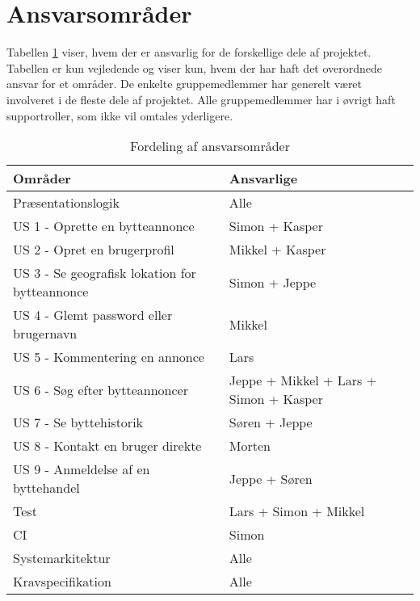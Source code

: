 \section{Ansvarsområder}
Tabellen \ref{fig:Ansvarstabel} viser, hvem der er ansvarlig for de forskellige dele af projektet. Tabellen er kun vejledende og viser kun, hvem der har haft det overordnede ansvar for et områder. De enkelte gruppemedlemmer har generelt været involveret i de fleste dele af projektet. Alle gruppemedlemmer har i øvrigt haft supportroller, som ikke vil omtales yderligere.  
\begin{table}[H]
	\begin{tabular}{ | l | p{5cm} |}
		\hline
		\textbf{Områder}  & \textbf{Ansvarlige} \\ \hline
		Præsentationslogik & Alle \\ \hline
		US 1 - Oprette en bytteannonce & Simon + Kasper \\ \hline
		US 2 - Opret en brugerprofil & Mikkel + Kasper \\ \hline
		US 3 - Se geografisk lokation for bytteannonce & Simon + Jeppe \\ \hline
		US 4 - Glemt password eller brugernavn & Mikkel \\ \hline
		US 5 - Kommentering en annonce & Lars \\ \hline
		US 6 - Søg efter bytteannoncer & Jeppe + Mikkel + Lars + Simon + Kasper \\ \hline
		US 7 - Se byttehistorik & Søren + Jeppe \\ \hline	
		US 8 - Kontakt en bruger direkte & Morten\\ \hline	
		US 9 - Anmeldelse af en byttehandel & Jeppe + Søren\\ \hline	
		Test & Lars + Simon + Mikkel  \\ \hline
		CI & Simon \\ \hline
		Systemarkitektur & Alle \\ \hline	
		Kravspecifikation & Alle \\ \hline	
	\end{tabular}
	\caption{Fordeling af ansvarsområder}
	\label{fig:Ansvarstabel}
\end{table}